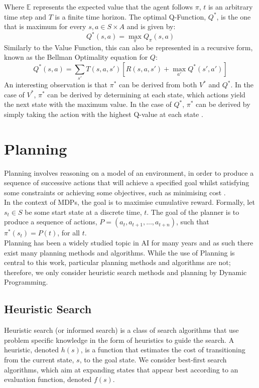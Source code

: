 Where $\mathbb{E}$ represents the expected value that the agent follows $\pi$, $t$ is an arbitrary time step and $T$ is a finite time horizon.
The optimal Q-Function, $Q^*$, is the one that is maximum for every $s,a \in S \times A$ and is given by:
\begin{equation}
\label{eqn:qso}
Q^*(s,a) = \max_\pi Q_\pi(s,a)
\end{equation}
Similarly to the Value Function, this can also be represented in a recursive form, known as the Bellman Optimality equation for $Q$:
\begin{equation}
\label{eqn:qsB}
Q^*(s,a) = \sum_{s'}T(s,a,s')[R(s,a,s')+\max_{a'}Q^*(s',a')]
\end{equation}
An interesting observation is that $\pi^*$ can be derived from both $V^*$ and $Q^*$. In the case of $V^*$, $\pi^*$ can be derived by determining at each state, which actions yield the next state with the maximum value. In the case of $Q^*$, $\pi^*$ can be derived by simply taking the action with the highest Q-value at each state \cite{Sutton1998}.

\section{Planning}
Planning involves reasoning on a model of an environment, in order to produce a sequence of successive actions that will achieve a specified goal whilst satisfying some constraints or achieving some objectives, such as minimising cost \cite{GhallabNauTraverso04, Lav06, DBLP:books/aw/RN2020}.
\\In the context of MDPs, the goal is to maximise cumulative reward. Formally, let $s_t \in S$ be some start state at a discrete time, $t$. The goal of the planner is to produce a sequence of actions, $P=(a_t, a_{t+1},...,a_{t+n})$, such that $\pi^*(s_t) = P(t)$, for all $t$.
\\Planning has been a widely studied topic in AI for many years and as such there exist many planning methods and algorithms. While the use of Planning is central to this work, particular planning methods and algorithms are not; therefore, we only consider heuristic search methods and planning by Dynamic Programming.
\subsection{Heuristic Search}
Heuristic search (or informed search) \cite{EdelkampSchroedl11} is a class of search algorithms that use problem specific knowledge in the form of heuristics to guide the search. A heuristic, denoted $h(s)$, is a function that estimates the cost of transitioning from the current state, $s$, to the goal state. We consider best-first search algorithms, which aim at expanding states that appear best according to an evaluation function, denoted $f(s)$. 


